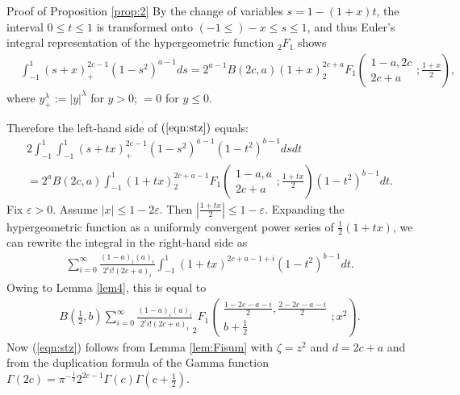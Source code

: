 \documentclass{article}
\numberwithin{equation}{section}
\newcommand{\assign}{:=}
\newenvironment{proof*}[1]{\noindent\textbf{#1\ }}{\hspace*{\fill}$\Box$\medskip}
\newcommand{\mygrammarfootnote}[1]{}
\begin{document}
\begin{proof*}{Proof of Proposition \ref{prop:2}}
  By the change of variables $s = 1 - (1 + x) t$, the interval $0 \leqslant t
  \leqslant 1$ is transformed onto $(- 1 \leqslant) - x \leqslant s \leqslant
  1$, and thus Euler's integral representation of the hypergeometric function
  $_2 F_1$ shows
  \begin{eqnarray}
    & \displaystyle\int_{- 1}^1 (s + x)_+^{2 c - 1} (1 - s^2)^{a - 1} d s = 2^{a - 1} B (2
    c, a) (1 + x)^{2 c + a} _2 F_1 \left( \begin{array}{c}
      1 - a, 2 c\\
      2 c + a
    \end{array} ; \frac{1 + x}{2} \right), &  \nonumber
  \end{eqnarray}
  where $y_+^{\lambda} \assign | y |^{\lambda}$ for $y > 0$; $= 0$ for $y
  \leqslant 0$.
  
  Therefore the left-hand side of $(\ref{eqn:stz})$ equals:
  \begin{eqnarray}
    & 2 \displaystyle\int_{- 1}^1 \displaystyle\int_{- 1}^1 (s + tx)_+^{2 c - 1} (1 - s^2)^{a - 1} (1 -
    t^2)^{b - 1} d s d t &  \nonumber\\
    & = 2^a B (2 c, a) \displaystyle\int_{- 1}^1 (1 + tx)^{2 c + a - 1} _2 F_1 \left(
    \begin{array}{c}
      1 - a, a\\
      2 c + a
    \end{array} ; \frac{1 + tx}{2} \right) (1 - t^2)^{b - 1} d t. &  \nonumber
  \end{eqnarray}
  Fix $\varepsilon > 0$. Assume $| x | \leqslant 1 - 2 \varepsilon$. Then
  $\left| \frac{1 + tx}{2} \right| \leqslant 1 - \varepsilon$. Expanding the
  hypergeometric function as a uniformly convergent power series of
  $\frac{1}{2} (1 + tx)$, we can rewrite the integral in the right-hand side
  as
  \begin{eqnarray}
    & \sum_{i = 0}^{\infty} \frac{(1 - a)_i (a)_i}{2^i i! (2 c + a)_i}
    \displaystyle\int_{- 1}^1 (1 + t x)^{2 c + a - 1 + i} (1 - t^2)^{b - 1} d t. & 
    \nonumber
  \end{eqnarray}
  Owing to Lemma \ref{lem4}, this is equal to
  \begin{eqnarray}
    & B \left( \frac{1}{2}, b \right) \sum_{i = 0}^{\infty} \frac{(1 - a)_i
    (a)_i}{2^i i! (2 c + a)_i} _2 F_1 \left( \begin{array}{c}
      \frac{1 - 2 c - a - i}{2}, \frac{2 - 2 c - a - i}{2}\\
      b + \frac{1}{2}
    \end{array} ; x^2 \right) . &  \nonumber
  \end{eqnarray}
  Now (\ref{eqn:stz}) follows from Lemma \ref{lem:Fisum} with $\zeta = z^2$
  and $d = 2 c + a$\mygrammarfootnote{maybe, we need a comma here?} and from the
  duplication formula of the Gamma function $\Gamma (2 c) = \pi^{-
  \frac{1}{2}} 2^{2 c - 1} \Gamma (c) \Gamma \left( c + \frac{1}{2} \right)$.
\end{proof*}
\end{document}

